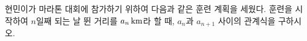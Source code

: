 \hspace*{2mm}\begin{minipage}[t]{\dimexpr\linewidth-2mm\relax}\vspace{0pt}
현민이가 마라톤 대회에 참가하기 위하여 다음과 같은 훈련 계획을 세웠다. \noindent 훈련을 시작하여 $n$일째 되는 날 뛴 거리를 $a_n\mkern3mu \mathrm{km}$라 할 때, $a_n$과 $a_{n+1}$ 사이의 관계식을 구하시오.\end{minipage}
